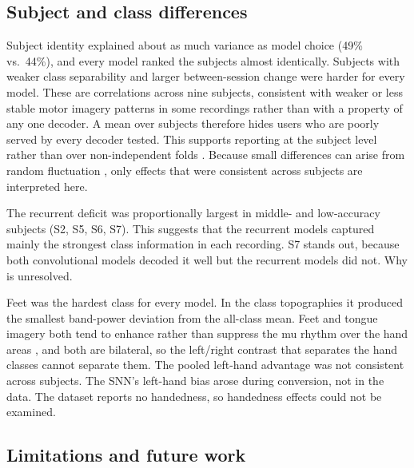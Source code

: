 \documentclass[conference]{IEEEtran}
\begin{document}
\subsection{Subject and class differences}

Subject identity explained about as much variance as model choice (49\% vs.\ 44\%), and every model ranked the subjects almost identically. Subjects with weaker class separability and larger between-session change were harder for every model. These are correlations across nine subjects, consistent with weaker or less stable motor imagery patterns in some recordings rather than with a property of any one decoder. A mean over subjects therefore hides users who are poorly served by every decoder tested. This supports reporting at the subject level rather than over non-independent folds \cite{lawhern2018}. Because small differences can arise from random fluctuation \cite{tangermann2012}, only effects that were consistent across subjects are interpreted here.

The recurrent deficit was proportionally largest in middle- and low-accuracy subjects (S2, S5, S6, S7). This suggests that the recurrent models captured mainly the strongest class information in each recording. S7 stands out, because both convolutional models decoded it well but the recurrent models did not. Why is unresolved.

Feet was the hardest class for every model. In the class topographies it produced the smallest band-power deviation from the all-class mean. Feet and tongue imagery both tend to enhance rather than suppress the mu rhythm over the hand areas \cite{pfurtscheller2006}, and both are bilateral, so the left/right contrast that separates the hand classes cannot separate them. The pooled left-hand advantage was not consistent across subjects. The SNN's left-hand bias arose during conversion, not in the data. The dataset reports no handedness, so handedness effects could not be examined.

\subsection{Limitations and future work}
\label{sec:future}
\end{document}
